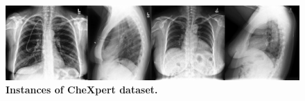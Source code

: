 \documentclass{article}
\begin{document}


\begin{figure}[h!]
	\centering
 		\includegraphics[width=4.in]{img/chx.png}
	\caption{{\bf Instances of CheXpert dataset.}}
	\label{fig:pcam_example}
\end{figure} 
\end{document}
